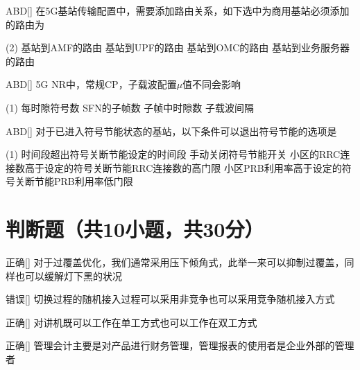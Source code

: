 \begin{choice}{\;ABD\;}[]
    在5G基站传输配置中，需要添加路由关系，如下选中为商用基站必须添加的路由为
    \begin{tasks}(2)
        \task 基站到AMF的路由
        \task 基站到UPF的路由
        \task 基站到OMC的路由
        \task 基站到业务服务器的路由
    \end{tasks}
\end{choice}

\begin{choice}{\;ABD\;}[]
    5G NR中，常规CP，子载波配置$μ$值不同会影响
    \begin{tasks}(1)
        \task 每时隙符号数
        \task SFN的子帧数
        \task 子帧中时隙数
        \task 子载波间隔
    \end{tasks}
\end{choice}

\begin{choice}{\;ABD\;}[]
    对于已进入符号节能状态的基站，以下条件可以退出符号节能的选项是
    \begin{tasks}(1)
        \task 时间段超出符号关断节能设定的时间段
        \task 手动关闭符号节能开关
        \task 小区的RRC连接数高于设定的符号关断节能RRC连接数的高门限
        \task 小区PRB利用率高于设定的符号关断节能PRB利用率低门限
    \end{tasks}
\end{choice}




\section{判断题（共10小题，共30分）}

\begin{choice}{\;正确\;}[]
    对于过覆盖优化，我们通常采用压下倾角式，此举一来可以抑制过覆盖，同样也可以缓解灯下黑的状况
\end{choice}


\begin{choice}{\;错误\;}[]
    切换过程的随机接入过程可以采用非竞争也可以采用竞争随机接入方式
\end{choice}

\begin{choice}{\;正确\;}[]
    对讲机既可以工作在单工方式也可以工作在双工方式
\end{choice}

\begin{choice}{\;正确\;}[]
    管理会计主要是对产品进行财务管理，管理报表的使用者是企业外部的管理者
\end{choice}

